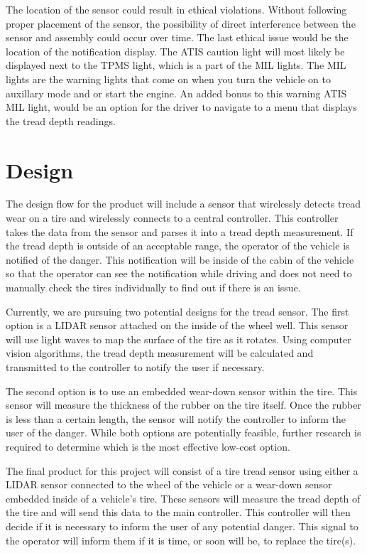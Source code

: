 \documentclass[11pt]{IEEEtran}
\begin{document}
		The location of the sensor could result in ethical violations. Without following proper placement of the sensor, the possibility of direct interference between the sensor and assembly could occur over time. The last ethical issue would be the location of the notification display. The ATIS caution light will most likely be displayed next to the TPMS light, which is a part of the MIL lights. The MIL lights are the warning lights that come on when you turn the vehicle on to auxillary mode and or start the engine. An added bonus to this warning ATIS MIL light, would be an option for the driver to navigate to a menu that displays the tread depth readings.




	\section{Design}
		The design flow for the product will include a sensor that wirelessly detects tread wear on a tire and wirelessly connects to a central controller. This controller takes the data from the sensor and parses it into a tread depth measurement. If the tread depth is outside of an acceptable range, the operator of the vehicle is notified of the danger. This notification will be inside of the cabin of the vehicle so that the operator can see the notification while driving and does not need to manually check the tires individually to find out if there is an issue. 

		Currently, we are pursuing two potential designs for the tread sensor. The first option is a LIDAR sensor attached on the inside of the wheel well. This sensor will use light waves to map the surface of the tire as it rotates. Using computer vision algorithms, the tread depth measurement will be calculated and transmitted to the controller to notify the user if necessary.

		The second option is to use an embedded wear-down sensor within the tire. This sensor will measure the thickness of the rubber on the tire itself. Once the rubber is less than a certain length, the sensor will notify the controller to inform the user of the danger. While both options are potentially feasible, further research is required to determine which is the most effective low-cost option.

		The final product for this project will consist of a tire tread sensor using either a LIDAR sensor connected to the wheel of the vehicle or a wear-down sensor embedded inside of a vehicle's tire. These sensors will measure the tread depth of the tire and will send this data to the main controller. This controller will then decide if it is necessary to inform the user of any potential danger. This signal to the operator will inform them if it is time, or soon will be, to replace the tire(s).
\end{document}
